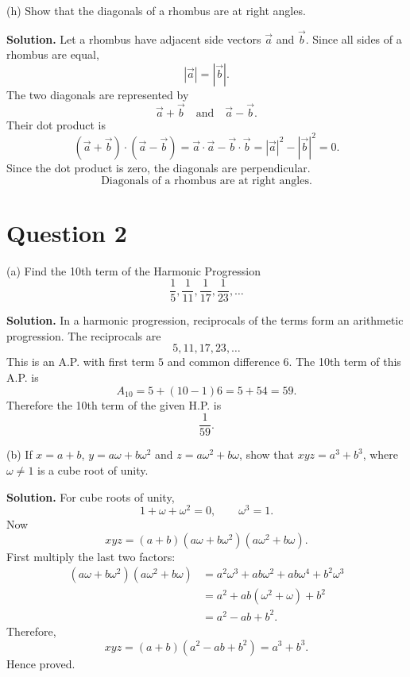 \documentclass[11pt,a4paper]{article}
\newcommand{\question}[1]{\vspace{0.4em}\begin{tcolorbox}[colback=gray!8,colframe=black!55,title=Question,fonttitle=\bfseries]#1\end{tcolorbox}}
\newcommand{\answer}{\textbf{Solution. }}
\begin{document}
\question{(h) Show that the diagonals of a rhombus are at right angles.}
\answer
Let a rhombus have adjacent side vectors $\vec a$ and $\vec b$. Since all sides of a rhombus are equal,
\[
|\vec a|=|\vec b|.
\]
The two diagonals are represented by
\[
\vec a+\vec b
\quad\text{and}\quad
\vec a-\vec b.
\]
Their dot product is
\[
(\vec a+\vec b)\cdot(\vec a-\vec b)=\vec a\cdot\vec a-\vec b\cdot\vec b
=|\vec a|^2-|\vec b|^2=0.
\]
Since the dot product is zero, the diagonals are perpendicular.
\[
\boxed{\text{Diagonals of a rhombus are at right angles.}}
\]
\begin{center}
\end{center}

\section*{Question 2}

\question{(a) Find the 10th term of the Harmonic Progression
\[
\frac15,\frac1{11},\frac1{17},\frac1{23},\ldots
\]}
\answer
In a harmonic progression, reciprocals of the terms form an arithmetic progression. The reciprocals are
\[
5,11,17,23,\ldots
\]
This is an A.P. with first term $5$ and common difference $6$. The 10th term of this A.P. is
\[
A_{10}=5+(10-1)6=5+54=59.
\]
Therefore the 10th term of the given H.P. is
\[
\boxed{\frac1{59}}.
\]

\question{(b) If $x=a+b$, $y=a\omega+b\omega^2$ and $z=a\omega^2+b\omega$, show that $xyz=a^3+b^3$, where $\omega\ne1$ is a cube root of unity.}
\answer
For cube roots of unity,
\[
1+\omega+\omega^2=0,\qquad \omega^3=1.
\]
Now
\[
xyz=(a+b)(a\omega+b\omega^2)(a\omega^2+b\omega).
\]
First multiply the last two factors:
\[
\begin{aligned}
(a\omega+b\omega^2)(a\omega^2+b\omega)
&=a^2\omega^3+ab\omega^2+ab\omega^4+b^2\omega^3\\
&=a^2+ab(\omega^2+\omega)+b^2\\
&=a^2-ab+b^2.
\end{aligned}
\]
Therefore,
\[
xyz=(a+b)(a^2-ab+b^2)=a^3+b^3.
\]
Hence proved.
\end{document}
